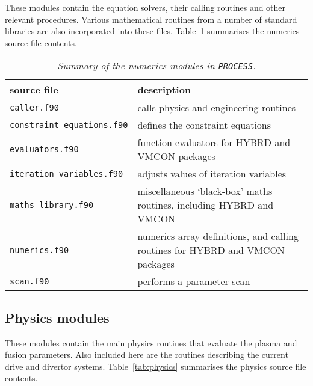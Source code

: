 \documentclass[11pt,a4paper]{report}
\newcommand{\process}{\mbox{\texttt{PROCESS}}}
\begin{document}
These modules contain the equation solvers, their calling routines and other
relevant procedures. Various mathematical routines from a number of standard
libraries are also incorporated into these files. Table~\ref{tab:numerics}
summarises the numerics source file contents.

\begin{table}[tbph]
\footnotesize
\begin{center}
\begin{tabular}{||l||l||} \hline
source file   & description \\ \hline
\texttt{caller.f90} & calls physics and engineering routines \\
\texttt{constraint\_equations.f90} & defines the constraint equations \\
\texttt{evaluators.f90} & function evaluators for HYBRD and VMCON packages \\
\texttt{iteration\_variables.f90} & adjusts values of iteration variables \\
\texttt{maths\_library.f90} & miscellaneous `black-box' maths routines,
including HYBRD and VMCON \\
\texttt{numerics.f90} & numerics array definitions, and calling routines for
HYBRD and VMCON packages \\
\texttt{scan.f90} & performs a parameter scan \\
\hline
\end{tabular}
\end{center}
\caption[Summary of numerics modules]
{\label{tab:numerics}
  \textit{Summary of the numerics modules in \process.}
}
\end{table}

\subsection{Physics modules}

These modules contain the main physics routines that evaluate the plasma and
fusion parameters. Also included here are the routines describing the current
drive and divertor systems. Table~\ref{tab:physics} summarises the physics
source file contents.
\end{document}
